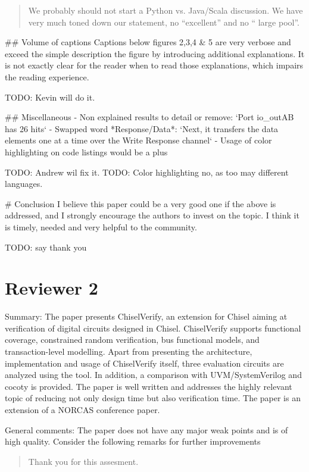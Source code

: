 \documentclass{article}
\newcommand{\todo}[1]{{\color{olive} TODO: #1}}
\newcommand{\reply}[1]{{\color{blue} #1}}
\begin{document}
\begin{quote}
\reply{We probably should not start a Python vs. Java/Scala discussion. We have very much toned down our statement, no ``excellent''
and no `` large pool''.}
\end{quote}

\#\# Volume of captions
Captions below figures 2,3,4 \& 5 are very verbose and exceed the simple description the figure by introducing additional explanations.
It is not exactly clear for the reader when to read those explanations, which impairs the reading experience.  

\todo{Kevin will do it.}

\#\# Miscellaneous
- Non explained results to detail or remove: `Port io\_outAB has 26 hits`
- Swapped word *Response/Data*: `Next, it transfers the data elements one at a time over the Write Response channel`
- Usage of color highlighting on code listings would be a plus

\todo{Andrew wil fix it.}
\todo{Color highlighting no, as too may different languages.}

\# Conclusion
I believe this paper could be a very good one if the above is addressed, and I strongly encourage the authors to invest on the topic. 
I think it is timely, needed and very helpful to the community.

\todo{say thank you}


\section*{Reviewer 2}

Summary:
The paper presents ChiselVerify, an extension for Chisel aiming at verification of digital circuits designed in Chisel. ChiselVerify supports functional coverage, constrained random verification, bus functional models, and transaction-level modelling. Apart from presenting the architecture, implementation and usage of ChiselVerify itself, three evaluation circuits are analyzed using the tool. In addition, a comparison with UVM/SystemVerilog and cocoty is provided. The paper is well written and addresses the highly relevant topic of reducing not only design time but also verification time. The paper is an extension of a NORCAS conference paper.

General comments:
The paper does not have any major weak points and is of high quality. Consider the following remarks for further improvements

\begin{quote}
\reply{Thank you for this assesment.}
\end{quote}
\end{document}
